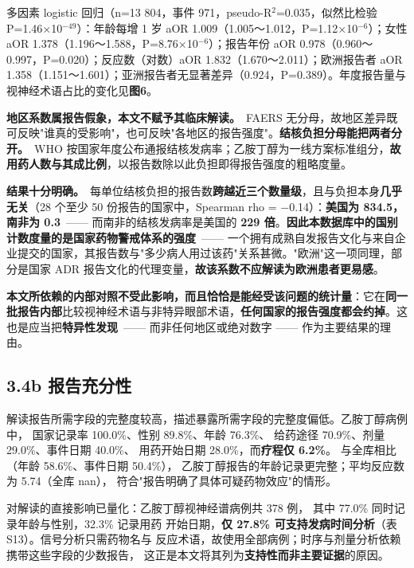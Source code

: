 \documentclass[UTF8,fontset=windows,11pt]{ctexart}
\begin{document}
多因素 logistic 回归（n=13 804，事件 971，pseudo-R$^{2}$=0.035，似然比检验 P=1.46×10$^{-49}$）：年龄每增 1 岁 aOR 1.009（1.005～1.012，P=1.12×10$^{-6}$）；女性 aOR 1.378（1.196～1.588，P=8.76×10$^{-6}$）；报告年份 aOR 0.978（0.960～0.997，P=0.020）；反应数（对数）aOR 1.832（1.670～2.011）；欧洲报告者 aOR 1.358（1.151～1.601）；亚洲报告者无显著差异（0.924，P=0.389）。年度报告量与视神经术语占比的变化见\textbf{图6}。

\textbf{地区系数属报告假象，本文不赋予其临床解读。}\ FAERS 无分母，故地区差异既可反映"谁真的受影响"，也可反映"各地区的报告强度"。\textbf{结核负担分母能把两者分开。}\ WHO 按国家年度公布通报结核发病率；乙胺丁醇为一线方案标准组分，\textbf{故用药人数与其成比例}，以报告数除以此负担即得报告强度的粗略度量。

\textbf{结果十分明确。}\ 每单位结核负担的报告数\textbf{跨越近三个数量级}，且与负担本身\textbf{几乎无关}（28 个至少 50 份报告的国家中，Spearman rho = −0.14）：\textbf{美国为 834.5，南非为 0.3}\ —— 而南非的结核发病率是美国的 \textbf{229 倍}。\textbf{因此本数据库中的国别计数度量的是国家药物警戒体系的强度}\ —— 一个拥有成熟自发报告文化与来自企业提交的国家，其报告数与"多少病人用过该药"关系甚微。"欧洲"这一项同理，部分是国家 ADR 报告文化的代理变量，\textbf{故该系数不应解读为欧洲患者更易感}。

\textbf{本文所依赖的内部对照不受此影响，而且恰恰是能经受该问题的统计量}：它在\textbf{同一批报告内部}比较视神经术语与非特异眼部术语，\textbf{任何国家的报告强度都会约掉}。这也是应当把\textbf{特异性发现}\ —— 而非任何地区或绝对数字 —— 作为主要结果的理由。

\subsection{3.4b 报告充分性}

解读报告所需字段的完整度较高，描述暴露所需字段的完整度偏低。乙胺丁醇病例中， 国家记录率 100.0\%、性别 89.8\%、年龄 76.3\%、 给药途径 70.9\%、剂量 29.0\%、事件日期 40.0\%、 用药开始日期 28.0\%，而\textbf{疗程仅 6.2\%}。 与全库相比（年龄 58.6\%、事件日期 50.4\%）， 乙胺丁醇报告的年龄记录更完整；平均反应数为 5.74（全库 nan）， 符合"报告明确了具体可疑药物效应"的情形。

对解读的直接影响已量化：乙胺丁醇视神经谱病例共 378 例， 其中 77.0\% 同时记录年龄与性别，32.3\% 记录用药 开始日期，\textbf{仅 27.8\% 可支持发病时间分析}（表S13）。信号分析只需药物名与 反应术语，故使用全部病例；时序与剂量分析依赖携带这些字段的少数报告， 这正是本文将其列为\textbf{支持性而非主要证据}的原因。
\end{document}
